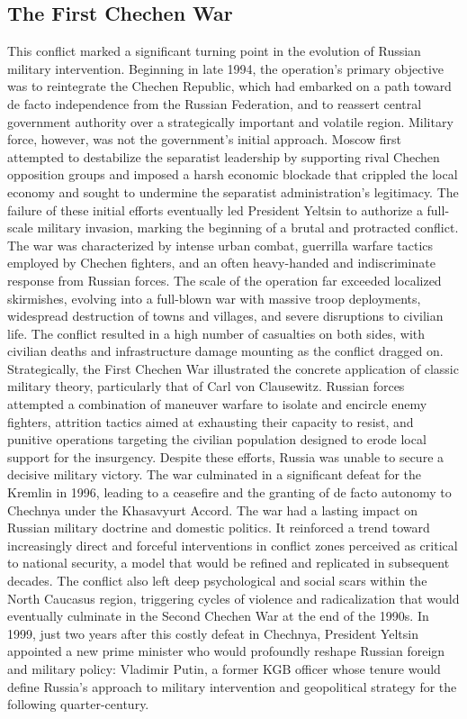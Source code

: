 \documentclass[12pt]{article}
\begin{document}

\subsection*{The First Chechen War}
This conflict marked a significant turning point in the evolution of Russian military intervention. Beginning in late 1994, the operation’s primary objective was to reintegrate the Chechen Republic, which had embarked on a path toward de facto independence from the Russian Federation, and to reassert central government authority over a strategically important and volatile region. Military force, however, was not the government’s initial approach. Moscow first attempted to destabilize the separatist leadership by supporting rival Chechen opposition groups and imposed a harsh economic blockade that crippled the local economy and sought to undermine the separatist administration’s legitimacy.
The failure of these initial efforts eventually led President Yeltsin to authorize a full-scale military invasion, marking the beginning of a brutal and protracted conflict. The war was characterized by intense urban combat, guerrilla warfare tactics employed by Chechen fighters, and an often heavy-handed and indiscriminate response from Russian forces. The scale of the operation far exceeded localized skirmishes, evolving into a full-blown war with massive troop deployments, widespread destruction of towns and villages, and severe disruptions to civilian life. The conflict resulted in a high number of casualties on both sides, with civilian deaths and infrastructure damage mounting as the conflict dragged on.
Strategically, the First Chechen War illustrated the concrete application of classic military theory, particularly that of Carl von Clausewitz. Russian forces attempted a combination of maneuver warfare to isolate and encircle enemy fighters, attrition tactics aimed at exhausting their capacity to resist, and punitive operations targeting the civilian population designed to erode local support for the insurgency. Despite these efforts, Russia was unable to secure a decisive military victory. The war culminated in a significant defeat for the Kremlin in 1996, leading to a ceasefire and the granting of de facto autonomy to Chechnya under the Khasavyurt Accord.
The war had a lasting impact on Russian military doctrine and domestic politics. It reinforced a trend toward increasingly direct and forceful interventions in conflict zones perceived as critical to national security, a model that would be refined and replicated in subsequent decades. The conflict also left deep psychological and social scars within the North Caucasus region, triggering cycles of violence and radicalization that would eventually culminate in the Second Chechen War at the end of the 1990s.
In 1999, just two years after this costly defeat in Chechnya, President Yeltsin appointed a new prime minister who would profoundly reshape Russian foreign and military policy: Vladimir Putin, a former KGB officer whose tenure would define Russia’s approach to military intervention and geopolitical strategy for the following quarter-century.
\end{document}
